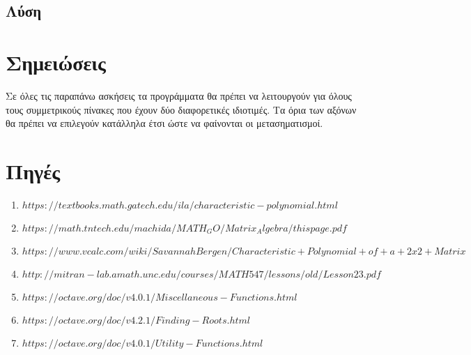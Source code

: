 \documentclass[a4paper,12pt]{article}
\begin{document}
\subsection{Λύση}
\newpage\section{Σημειώσεις}
Σε όλες τις παραπάνω ασκήσεις τα προγράμματα θα πρέπει να λειτουργούν για όλους τους συμμετρικούς πίνακες
που έχουν δύο διαφορετικές ιδιοτιμές. Τα όρια των αξόνων θα πρέπει να επιλεγούν κατάλληλα έτσι ώστε να
φαίνονται οι μετασηματισμοί.
\newpage\section{Πηγές}
\begin{enumerate}
    \item $https://textbooks.math.gatech.edu/ila/characteristic-polynomial.html$
    \item $https://math.tntech.edu/machida/MATH_GO/Matrix_Algebra/thispage.pdf$
    \item $https://www.vcalc.com/wiki/SavannahBergen/Characteristic+Polynomial+of+a+2x2+Matrix$
    \item $http://mitran-lab.amath.unc.edu/courses/MATH547/lessons/old/Lesson23.pdf$
    \item $https://octave.org/doc/v4.0.1/Miscellaneous-Functions.html$
    \item $https://octave.org/doc/v4.2.1/Finding-Roots.html$
    \item $https://octave.org/doc/v4.0.1/Utility-Functions.html$
\end{enumerate}
\end{document}
